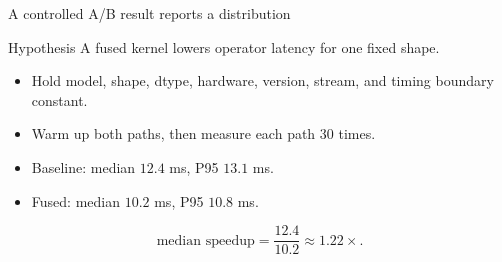 \documentclass[aspectratio=169,11pt]{beamer}
\newcommand{\key}[1]{\textcolor{HUSTDeep}{\textbf{#1}}}
\begin{document}

\begin{frame}{A controlled A/B result reports a distribution}
  \begin{block}{Hypothesis}
    A fused kernel lowers operator latency for one fixed shape.
  \end{block}
  \begin{itemize}
    \item Hold model, shape, dtype, hardware, version, stream, and timing boundary constant.
    \item Warm up both paths, then measure each path 30 times.
    \item Baseline: median \(12.4\) ms, P95 \(13.1\) ms.
    \item Fused: median \(10.2\) ms, P95 \(10.8\) ms.
  \end{itemize}
  \[
    \text{median speedup}=\frac{12.4}{10.2}\approx1.22\times.
  \]
\end{frame}
\end{document}
